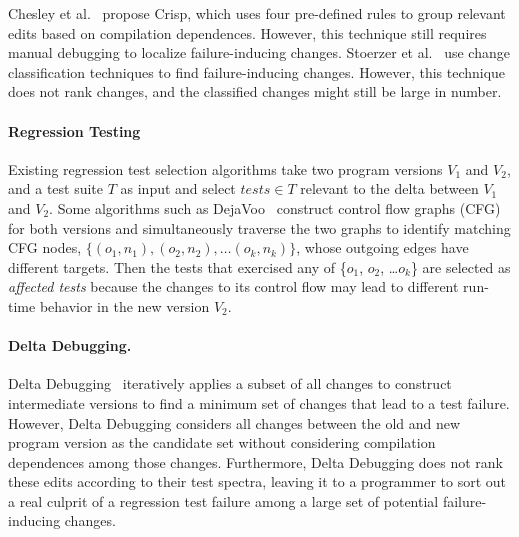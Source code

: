 \documentclass[runningheads,a4paper]{llncs}
\begin{document}
Chesley et al.~\cite{chesley2005crisp} propose Crisp, which uses four pre-defined rules to group relevant edits based on compilation dependences. However, this technique still requires manual debugging to localize failure-inducing changes. Stoerzer et al.~\cite{stoerzer2006finding} use change classification techniques to find failure-inducing changes. However, this technique does not rank changes, and the classified changes might still be large in number. 

\paragraph{Regression Testing} 
Existing regression test selection algorithms take two program versions $V_1$ and $V_2$, and a test suite $T$ as input and select $tests \in T$ relevant to the delta between $V_1$ and $V_2$. Some algorithms such as DejaVoo~\cite{Rothermel1997, Harrold2001, Orso2004} construct control flow graphs (CFG) for both versions and simultaneously traverse the two graphs to identify matching CFG nodes, $\{(o_1, n_1), (o_2, n_2), \ldots (o_k, n_k)\}$, whose outgoing edges have different targets. Then the tests that exercised any of \{$o_1$, $o_2$, \ldots $o_k$\} are selected as {\em affected tests} because the changes to its control flow may lead to different run-time behavior in the new version $V_2$. 

\paragraph{Delta Debugging.} 
Delta Debugging~\cite{zeller1999yesterday, zeller2001automated} iteratively applies a subset of all changes to
construct intermediate versions to find a minimum set of changes that lead to
a test failure. However, Delta Debugging considers all changes between
the old and new program version as the candidate set without considering compilation dependences among those changes. Furthermore,
Delta Debugging does not rank these edits according to their test spectra, leaving it to a
programmer to sort out a real culprit of a regression test failure among a
large set of potential failure-inducing changes.
\end{document}
